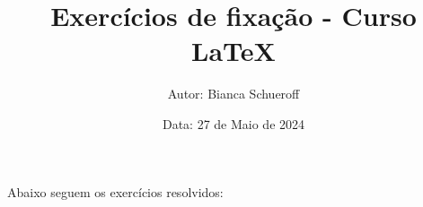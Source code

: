 \documentclass[a4paper, 12pt]{article}
\title{\textbf{Exercícios de fixação - Curso LaTeX}}
\author{Autor: Bianca Schueroff}
\date{Data: 27 de Maio de 2024}
\begin{document}
\maketitle

Abaixo seguem os exercícios resolvidos:
\end{document}
